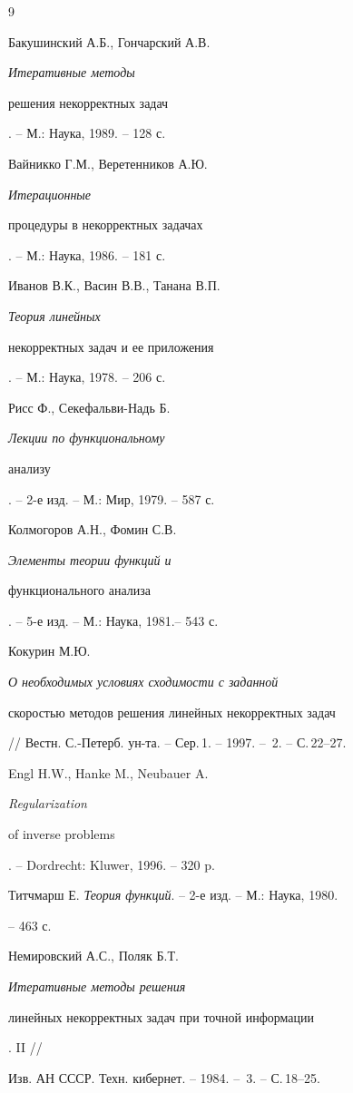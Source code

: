 \begin{thebibliography}{9} 


 




Бакушинский А.Б., Гончарский А.В. {\em Итеративные методы 


решения некорректных задач}. -- М.: Наука, 1989. -- 128 с. 




Вайникко Г.М., Веретенников А.Ю. {\em Итерационные 


процедуры в некорректных задачах}. -- М.: Наука, 1986. -- 181 с. 




Иванов В.К., Васин В.В., Танана В.П. {\em Теория линейных 


некорректных задач и ее при\-ло\-же\-ния}. -- М.: Наука, 1978. -- 206 с. 




Рисс Ф., Секефальви-Надь Б. {\em Лекции по функциональному 


анализу}. -- 2-е изд. -- М.: Мир, 1979. -- 587 с. 




Колмогоров А.Н., Фомин С.В. {\em Элементы теории функций и 


функционального анализа}. -- 5-е изд. -- М.: Наука, 1981.-- 543 с. 




Кокурин М.Ю. {\em О необходимых условиях сходимости с заданной 


скоростью методов решения линейных некорректных задач} 


// Вестн. С.-Петерб. ун-та. -- Сер.\,1. -- 1997. -- \No\,2. -- С.\,22--27. 




Engl H.W., Hanke M., Neubauer A. {\em Regularization 


of inverse problems}. -- Dordrecht: Kluwer, 1996. -- 320 p. 




Титчмарш Е. {\em Теория функций}. -- 2-е изд. -- М.: Наука, 1980. 


-- 463 с. 




Немировский А.С., Поляк Б.Т. {\em Итеративные методы решения 


линейных некорректных задач при точной информации}. II // 


Изв. АН СССР. Техн. кибернет. -- 1984. -- \No\,3. -- С.\,18--25. 


 


\end{thebibliography} 


 


\vskip 2cm 


 






 


\label{end} 


 


 


